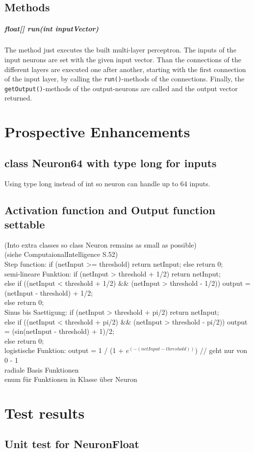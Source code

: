 \section{Methods}
\paragraph{float[] run(int inputVector)}
The method just executes the built multi-layer perceptron. The inputs of the input neurons are set with the given input vector. Than the connections of the different layers are executed one after another, starting with the first connection of the input layer, by calling the \texttt{run()}-methods of the connections. Finally, the \texttt{getOutput()}-methods of the output-neurons are called and the output vector returned.

\chapter{Prospective Enhancements}
\section{class Neuron64 with type long for inputs} %
Using type long instead of int so neuron can handle up to 64 inputs.

\section{Activation function and Output function settable}
(Into extra classes so class Neuron remains as small as possible)\\
(siehe ComputaionalIntelligence S.52)\\
Step function:	if (netInput >= threshold) return netInput; else return 0;\\
semi-lineare Funktion: if (netInput > threshold + 1/2) return netInput;\\
else if ((netInput < threshold + 1/2) \&\& (netInput > threshold - 1/2)) output = (netInput - threshold) + 1/2;\\
else return 0;\\
Sinus bis Saettigung: if (netInput > threshold + pi/2) return netInput;\\
else if ((netInput < threshold + pi/2) \&\& (netInput > threshold - pi/2)) output = (sin(netInput - threshold) + 1)/2;\\
else return 0;\\
logistische Funktion: output = 1 / (1 + $e^{(-(netInput - threshold))}$) // geht nur von 0 - 1\\
radiale Basis Funktionen\\
enum für Funktionen in Klasse über Neuron

\chapter{Test results}
\section{Unit test for NeuronFloat}
